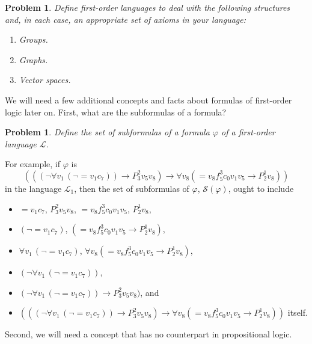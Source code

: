\documentclass[12pt]{amsbook}
\theoremstyle{plain}
\newtheorem{prob}[thm]{Problem}
\theoremstyle{definition}
\theoremstyle{remark}
\begin{document}
\begin{prob} \label{p:fole}
Define first-order languages to deal with the following structures and,  in each case,  an appropriate set of axioms in your language:
\begin{enumerate}
\item Groups.
\item Graphs.
\item Vector spaces.
\end{enumerate}
\end{prob}

We will need a few additional concepts and facts about formulas of first-order logic later on.  First,  what are the subformulas of a formula?  

\begin{prob}  \label{p:five10} 
Define the set of subformulas of a formula $\varphi$ of a first-order language $\mathcal{L}$.
\end{prob}

For example,  if $\varphi$ is
\[
(((\lnot \forall v_1\, (\lnot =v_1c_7) ) \to P^2_3 v_5 v_8) \to \forall v_8 ( = v_8 f^3_5 c_0 v_1 v_5 \to P^1_2 v_8 ))
\] 
in the language $\mathcal{L}_1$,  then the set of subformulas of $\varphi$,  $\mathcal{S}(\varphi)$,  ought to include 
\begin{itemize}
\item $=v_1c_7$, $P^2_3 v_5 v_8$, $= v_8 f^3_5 c_0 v_1 v_5$, $P^1_2 v_8$,  
\item $(\lnot =v_1c_7)$, $(= v_8 f^3_5 c_0 v_1 v_5 \to P^1_2 v_8)$,  
\item $\forall v_1\, (\lnot =v_1c_7)$, $\forall v_8 (= v_8 f^3_5 c_0 v_1 v_5 \to P^1_2 v_8)$,  
\item $(\lnot \forall v_1\, (\lnot =v_1c_7))$,
\item $(\lnot \forall v_1\, (\lnot =v_1c_7) ) \to P^2_3 v_5 v_8)$,  and 
\item $(((\lnot \forall v_1\, (\lnot =v_1c_7) ) \to P^2_3 v_5 v_8) \to \forall v_8 (= v_8 f^3_5 c_0 v_1 v_5 \to P^1_2 v_8 ))$ itself.
\end{itemize}

Second,  we will need a concept that has no counterpart in propositional logic.
\end{document}
